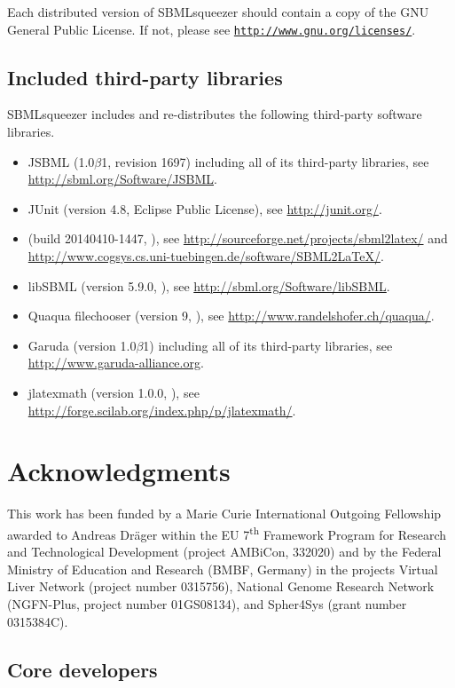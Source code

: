 Each distributed version of SBMLsqueezer should contain a copy of the 
GNU General Public License. If not, please see
\href{http://www.gnu.org/licenses/gpl-3.0-standalone.html}{\nolinkurl{http://www.gnu.org/licenses/}}.


\section{Included third-party libraries}
SBMLsqueezer includes and re-distributes the following third-party software libraries.
\begin{itemize}
  \item JSBML (1.0$\beta$1, revision 1697) including all of its third-party libraries, see \url{http://sbml.org/Software/JSBML}.
  \item JUnit (version 4.8, Eclipse Public License), see \url{http://junit.org/}.
  \item \SBMLLaTeX (build 20140410-1447, \GPL), see \url{http://sourceforge.net/projects/sbml2latex/} and \url{http://www.cogsys.cs.uni-tuebingen.de/software/SBML2LaTeX/}.
  \item libSBML (version 5.9.0, \LGPL), see \url{http://sbml.org/Software/libSBML}.
  \item Quaqua filechooser (version 9, \LGPL), see \url{http://www.randelshofer.ch/quaqua/}.
  \item Garuda (version 1.0$\beta$1) including all of its third-party libraries, see \url{http://www.garuda-alliance.org}.
  \item jlatexmath (version 1.0.0, \GPL), see \url{http://forge.scilab.org/index.php/p/jlatexmath/}.
\end{itemize}

\chapter{Acknowledgments}

This work has been funded by a Marie Curie International Outgoing Fellowship
awarded to Andreas Dr\"ager within the EU 7\textsuperscript{th} Framework
Program for Research and Technological Development (project AMBiCon, 332020) and
by the Federal Ministry of Education and Research (BMBF, Germany) in the
projects Virtual Liver Network (project number 0315756), National Genome
Research Network (NGFN-Plus, project number 01GS08134), and Spher4Sys (grant
number 0315384C).

\section{Core developers}

